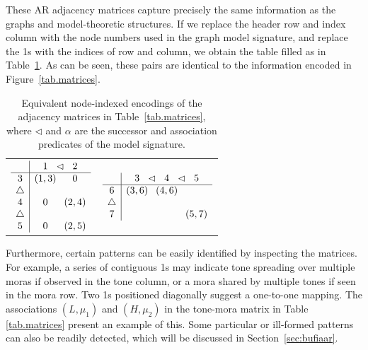 \documentclass{CUP-JNL-PHO}%
\theoremstyle{definition}
\numberwithin{equation}{section}
\theoremstyle{definition}
\begin{document}
These AR adjacency matrices capture precisely the same information as
the graphs and model-theoretic structures. If we replace the header
row and index column with the node numbers used in the graph model
signature, and replace the 1s with the indices of row and column, we
obtain the table filled as in Table~\ref{tab.index}. As can be
seen, these pairs are identical to the information encoded in
Figure~\ref{tab.matrices}.

\begin{table}[ht]
	\centering
	\begin{tabular}{cc}
		$\begin{array}{c|c@{}c@{}c}
			& 1 & \lhd & 2 \\
			\hline
			3 & (1,3)  && 0 \\
			\bigtriangleup & && \\
			4 & 0 & & (2,4) \\
			\bigtriangleup & && \\
			5 & 0 & & (2,5) \\
		\end{array}$ \hspace{1em} &
		$\begin{array}{c|c@{}c@{}c@{}c@{}c}
			& 3 & \lhd & 4 & \lhd & 5 \\
			\hline
			6           & (3,6) &         & (4,6) &         &   	\\
			\bigtriangleup  &       &         &       &         &   	\\
			7           &       &         &       &         & (5,7) \\
		\end{array}$
	\end{tabular}
\caption{Equivalent node-indexed encodings of the adjacency matrices in Table~\ref{tab.matrices}, where $\lhd$ and $\alpha$ are the successor and association predicates of the model signature.}
	\label{tab.index}
\end{table}

Furthermore, certain patterns can be easily identified by inspecting the
matrices. For example, a series of contiguous 1s may indicate tone 
spreading over multiple moras if observed in the tone column, or a mora 
shared by multiple tones if seen in the mora row. 
Two 1s positioned diagonally suggest a one-to-one mapping.
The associations $(L,\mu_1)$ and $(H,\mu_2)$
in the tone-mora matrix in Table \ref{tab.matrices}
present an example of this.
Some particular or ill-formed patterns can also be 
readily detected, which will be discussed in Section~\ref{sec:bufiaar}.
\end{document}
